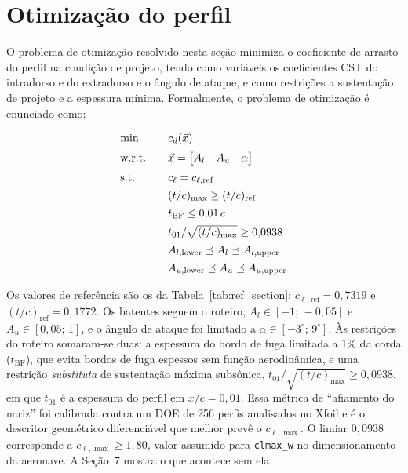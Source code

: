 \newpage
\section{Otimização do perfil}

O problema de otimização resolvido nesta seção minimiza o coeficiente de
arrasto do perfil na condição de projeto, tendo como variáveis os
coeficientes CST do intradorso e do extradorso e o ângulo de ataque, e como
restrições a sustentação de projeto e a espessura mínima. Formalmente, o
problema de otimização é enunciado como:

\begin{equation*}
\begin{array}{@{}l@{\qquad}l@{}}
\text{min}    & c_d(\vec{x}) \\[1.4ex]
\text{w.r.t.} & \vec{x} = \begin{bmatrix} A_l & A_u & \alpha \end{bmatrix} \\[1.4ex]
\text{s.t.}   & c_\ell = c_{\ell,\mathrm{ref}} \\[1.0ex]
              & (t/c)_{\max} \ge (t/c)_{\mathrm{ref}} \\[1.0ex]
              & t_{\mathrm{BF}} \le 0{,}01\,c \\[1.0ex]
              & t_{01}/\sqrt{(t/c)_{\max}} \ge 0{,}0938 \\[1.0ex]
              & A_{l,\mathrm{lower}} \preceq A_l \preceq A_{l,\mathrm{upper}} \\[1.0ex]
              & A_{u,\mathrm{lower}} \preceq A_u \preceq A_{u,\mathrm{upper}}
\end{array}
\end{equation*}
\par\medskip

Os valores de referência são os da Tabela~\ref{tab:ref_section}:
$c_{\ell,\mathrm{ref}} = 0{,}7319$ e $(t/c)_{\mathrm{ref}} = 0{,}1772$. Os
batentes seguem o roteiro, $A_{l} \in [-1;\,-0{,}05]$ e
$A_{u} \in [0{,}05;\,1]$, e o ângulo de ataque foi limitado a
$\alpha \in [-3^\circ;\,9^\circ]$. Às restrições do roteiro somaram-se duas:
a espessura do bordo de fuga limitada a $1\%$ da corda ($t_{\mathrm{BF}}$),
que evita bordos de fuga espessos sem função aerodinâmica, e uma restrição
\emph{substituta} de sustentação máxima subsônica,
$t_{01}/\sqrt{(t/c)_{\max}} \ge 0{,}0938$, em que $t_{01}$ é a espessura do
perfil em $x/c = 0{,}01$. Essa métrica de ``afiamento do nariz'' foi
calibrada contra um DOE de 256 perfis analisados no Xfoil e é o descritor
geométrico diferenciável que melhor prevê o $c_{\ell,\max}$. O limiar
$0{,}0938$ corresponde a $c_{\ell,\max} \ge 1{,}80$, valor assumido para
\texttt{clmax\_w} no dimensionamento da aeronave. A Seção~7 mostra o que
acontece sem ela.

